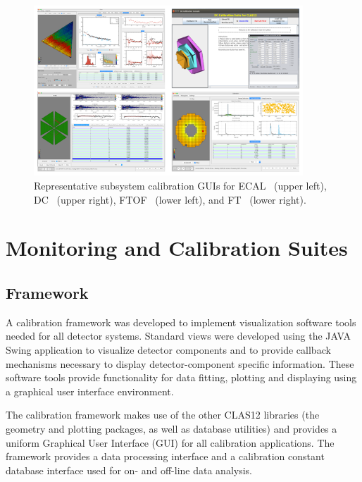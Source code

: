 \begin{figure}
\centering
\includegraphics[width=0.9\textwidth]{pics/suites.png}
\caption{Representative subsystem calibration GUIs for ECAL~\cite{ecal-nim} (upper left),
DC~\cite{dc-nim} (upper right), FTOF~\cite{ftof-nim} (lower left),  and FT~\cite{ft-nim} (lower right).}
\label{suites}
\end{figure}
\section{Monitoring and Calibration Suites}\label{sec:calibration}

\subsection{Framework}

A calibration framework was developed to implement visualization software tools needed for all detector
systems. Standard views were developed using the JAVA Swing application to visualize detector components and to provide callback
mechanisms necessary to display detector-component specific information.  These software tools provide
functionality for data fitting, plotting and displaying using a graphical user interface environment.

The calibration framework makes use of the other CLAS12 libraries
(the geometry and plotting packages, as well as database utilities) and provides a uniform Graphical User
Interface (GUI) for all calibration applications. The framework provides a data processing interface
and a calibration constant database interface used
for on- and off-line data analysis.

